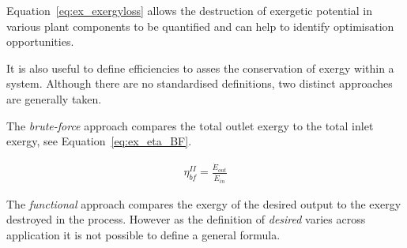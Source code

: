         Equation~\eqref{eq:ex_exergyloss} allows the destruction of exergetic potential in various plant components to be quantified and can help to identify optimisation opportunities.

        It is also useful to define efficiencies to asses the conservation of exergy within a system. Although there are no standardised definitions, two distinct approaches are generally taken. 
        
        The \emph{brute-force} approach compares the total outlet exergy to the total inlet exergy, see Equation~\eqref{eq:ex_eta_BF}.

        \begin{align} 
            \eta_{bf}^{II}= \frac{\Dot{E}_{out}}{\Dot{E}_{in}} \label{eq:ex_eta_BF}
        \end{align}

         The \emph{functional} approach compares the exergy of the desired output to the exergy destroyed in the process. However as the definition of \emph{desired} varies across application it is not possible to define a general formula.